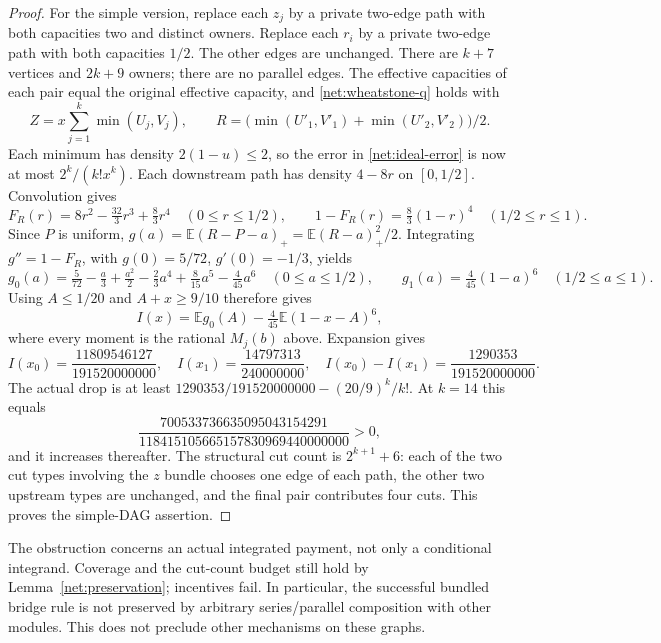 \documentclass[11pt]{article}
\theoremstyle{definition}\newtheorem{definition}[theorem]{Definition}
\theoremstyle{remark}\newtheorem{remark}[theorem]{Remark}
\newcommand{\E}{\mathbb E}
\begin{document}
\begin{proof}
For the simple version, replace each $z_j$ by a private two-edge path with
both capacities two and distinct owners.  Replace each $r_i$ by a private
two-edge path with both capacities $1/2$.  The other edges are unchanged.
There are $k+7$ vertices and $2k+9$ owners; there are no parallel edges.
The effective capacities of each pair equal the original effective capacity,
and \eqref{net:wheatstone-q} holds with
\[
 Z=x\sum_{j=1}^k\min(U_j,V_j),\qquad
 R=\bigl(\min(U'_1,V'_1)+\min(U'_2,V'_2)\bigr)/2.
\]
Each minimum has density $2(1-u)\le2$, so the error in
\eqref{net:ideal-error} is now at most $2^k/(k!x^k)$.
Each downstream path has density $4-8r$ on $[0,1/2]$.
Convolution gives
\[
 F_R(r)=8r^2-\tfrac{32}{3}r^3+\tfrac83r^4\quad(0\le r\le1/2),
 \qquad 1-F_R(r)=\tfrac83(1-r)^4\quad(1/2\le r\le1).
\]
Since $P$ is uniform, $g(a)=\E(R-P-a)_+=\E(R-a)_+^2/2$.
Integrating $g''=1-F_R$, with $g(0)=5/72$, $g'(0)=-1/3$, yields
\[
 g_0(a)=\tfrac5{72}-\tfrac a3+\tfrac{a^2}2-\tfrac23a^4
               +\tfrac8{15}a^5-\tfrac4{45}a^6\quad(0\le a\le1/2),
 \qquad g_1(a)=\tfrac4{45}(1-a)^6\quad(1/2\le a\le1).
\]
Using $A\le1/20$ and $A+x\ge9/10$ therefore gives
\[
 I(x)=\E g_0(A)-\tfrac4{45}\E(1-x-A)^6,
\]
where every moment is the rational $M_j(b)$ above.  Expansion gives
\[
 I(x_0)=\frac{11809546127}{191520000000},\quad
 I(x_1)=\frac{14797313}{240000000},\quad
 I(x_0)-I(x_1)=\frac{1290353}{191520000000}.
\]
The actual drop is at least
$1290353/191520000000-(20/9)^k/k!$.
At $k=14$ this equals
\[
 \frac{700533736635095043154291}{118415105665157830969440000000}>0,
\]
and it increases thereafter.  The structural cut count is
$2^{k+1}+6$: each of the two cut types involving the $z$ bundle chooses one
edge of each path, the other two upstream types are unchanged, and the
final pair contributes four cuts.  This proves the simple-DAG assertion.
\end{proof}
The obstruction concerns an actual integrated payment, not only a conditional
integrand.  Coverage and the cut-count budget still hold by
Lemma~\ref{net:preservation}; incentives fail.  In particular, the successful
bundled bridge rule is not preserved by arbitrary series/parallel composition
with other modules.  This does not preclude other mechanisms on these graphs.
\end{document}
